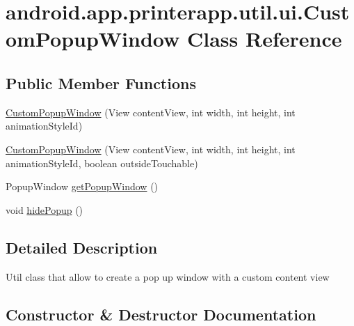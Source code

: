 \hypertarget{classandroid_1_1app_1_1printerapp_1_1util_1_1ui_1_1_custom_popup_window}{}\section{android.\+app.\+printerapp.\+util.\+ui.\+Custom\+Popup\+Window Class Reference}
\label{classandroid_1_1app_1_1printerapp_1_1util_1_1ui_1_1_custom_popup_window}
\subsection*{Public Member Functions}
\begin{DoxyCompactItemize}
\item 
\hyperlink{classandroid_1_1app_1_1printerapp_1_1util_1_1ui_1_1_custom_popup_window_ae6cc404993273461a4220c1175da0a63}{Custom\+Popup\+Window} (View content\+View, int width, int height, int animation\+Style\+Id)
\item 
\hyperlink{classandroid_1_1app_1_1printerapp_1_1util_1_1ui_1_1_custom_popup_window_a88aceabea9819462a3b96494a7f36ab3}{Custom\+Popup\+Window} (View content\+View, int width, int height, int animation\+Style\+Id, boolean outside\+Touchable)
\item 
Popup\+Window \hyperlink{classandroid_1_1app_1_1printerapp_1_1util_1_1ui_1_1_custom_popup_window_a7da21b0c029af75adf167b38cd79a268}{get\+Popup\+Window} ()
\item 
void \hyperlink{classandroid_1_1app_1_1printerapp_1_1util_1_1ui_1_1_custom_popup_window_ae48c8ae5a04f5b1bb6883d8308cf4cf7}{hide\+Popup} ()
\end{DoxyCompactItemize}


\subsection{Detailed Description}
Util class that allow to create a pop up window with a custom content view 

\subsection{Constructor \& Destructor Documentation}
\mbox{\label{classandroid_1_1app_1_1printerapp_1_1util_1_1ui_1_1_custom_popup_window_ae6cc404993273461a4220c1175da0a63}} 
